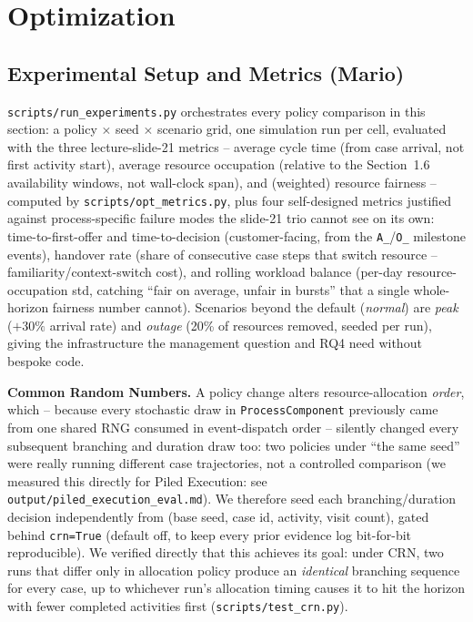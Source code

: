 \documentclass[
  english,        %
  font=times,     %
  twocolumn,      %
]{tumarticle}
\begin{document}
\section{Optimization}
\label{sec:optimization}

\subsection{Experimental Setup and Metrics (Mario)}
\label{sec:optsetup}
\texttt{scripts/run\_experiments.py} orchestrates every policy comparison
in this section: a policy $\times$ seed $\times$ scenario grid, one
simulation run per cell, evaluated with the three lecture-slide-21
metrics -- average cycle time (from case arrival, not first activity
start), average resource occupation (relative to the Section~1.6
availability windows, not wall-clock span), and (weighted) resource
fairness -- computed by \texttt{scripts/opt\_metrics.py}, plus four
self-designed metrics justified against process-specific failure modes
the slide-21 trio cannot see on its own: time-to-first-offer and
time-to-decision (customer-facing, from the \texttt{A\_}/\texttt{O\_}
milestone events), handover rate (share of consecutive case steps that
switch resource -- familiarity/context-switch cost), and rolling
workload balance (per-day resource-occupation std, catching ``fair on
average, unfair in bursts'' that a single whole-horizon fairness number
cannot). Scenarios beyond
the default (\emph{normal}) are \emph{peak} ($+30\%$ arrival rate) and
\emph{outage} (20\% of resources removed, seeded per run), giving the
infrastructure the management question and RQ4 need without bespoke code.

\textbf{Common Random Numbers.} A policy change alters resource-allocation
\emph{order}, which -- because every stochastic draw in
\texttt{ProcessComponent} previously came from one shared RNG consumed in
event-dispatch order -- silently changed every subsequent branching and
duration draw too: two policies under ``the same seed'' were really
running different case trajectories, not a controlled comparison (we
measured this directly for Piled Execution: see
\texttt{output/piled\_execution\_eval.md}). We therefore seed each
branching/duration decision independently from
(base seed, case id, activity, visit count), gated behind \texttt{crn=True}
(default off, to keep every prior evidence log bit-for-bit reproducible).
We verified directly that this achieves its goal: under CRN, two runs that
differ only in allocation policy produce an \emph{identical} branching
sequence for every case, up to whichever run's allocation timing causes it
to hit the horizon with fewer completed activities first
(\texttt{scripts/test\_crn.py}).
\end{document}
